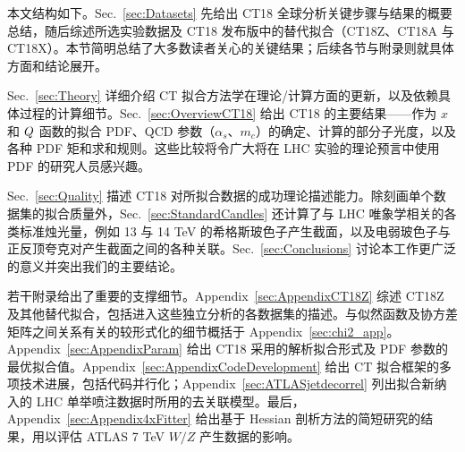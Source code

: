 本文结构如下。Sec.~\ref{sec:Datasets} 先给出 CT18 全球分析关键步骤与结果的概要总结，随后综述所选实验数据及 CT18 发布版中的替代拟合（CT18Z、CT18A 与 CT18X）。本节简明总结了大多数读者关心的关键结果；后续各节与附录则就具体方面和结论展开。

Sec.~\ref{sec:Theory} 详细介绍 CT 拟合方法学在理论/计算方面的更新，以及依赖具体过程的计算细节。Sec.~\ref{sec:OverviewCT18} 给出 CT18 的主要结果——作为 $x$ 和 $Q$ 函数的拟合 PDF、QCD 参数（$\alpha_s$、$m_c$）的确定、计算的部分子光度，以及各种 PDF 矩和求和规则。这些比较将令广大将在 LHC 实验的理论预言中使用 PDF 的研究人员感兴趣。

Sec.~\ref{sec:Quality} 描述 CT18 对所拟合数据的成功理论描述能力。除刻画单个数据集的拟合质量外，Sec.~\ref{sec:StandardCandles} 还计算了与 LHC 唯象学相关的各类标准烛光量，例如 13 与 14 TeV 的希格斯玻色子产生截面，以及电弱玻色子与正反顶夸克对产生截面之间的各种关联。Sec.~\ref{sec:Conclusions} 讨论本工作更广泛的意义并突出我们的主要结论。

若干附录给出了重要的支撑细节。Appendix~\ref{sec:AppendixCT18Z} 综述 CT18Z 及其他替代拟合，包括进入这些独立分析的各数据集的描述。与似然函数及协方差矩阵之间关系有关的较形式化的细节概括于 Appendix~\ref{sec:chi2_app}。Appendix~\ref{sec:AppendixParam} 给出 CT18 采用的解析拟合形式及 PDF 参数的最优拟合值。Appendix~\ref{sec:AppendixCodeDevelopment} 给出 CT 拟合框架的多项技术进展，包括代码并行化；Appendix~\ref{sec:ATLASjetdecorrel} 列出拟合新纳入的 LHC 单举喷注数据时所用的去关联模型。最后，Appendix~\ref{sec:Appendix4xFitter} 给出基于 Hessian 剖析方法的简短研究的结果，用以评估 ATLAS 7 TeV $W/Z$ 产生数据的影响。
